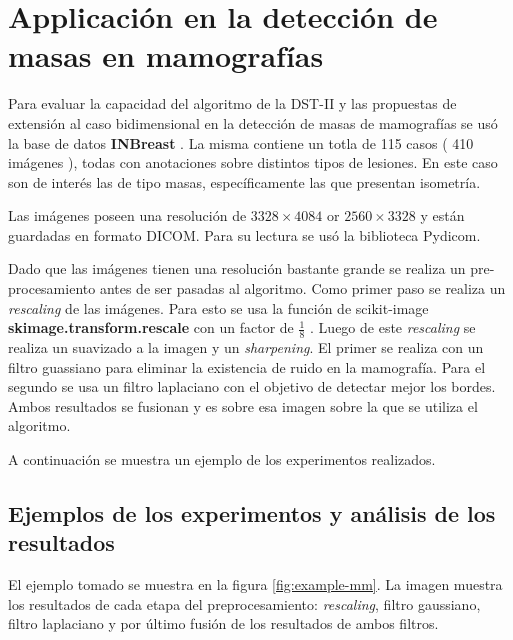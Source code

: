 \section{Applicación en la detección de masas en mamografías}

Para evaluar la capacidad del algoritmo de la DST-II y las propuestas de extensión al caso bidimensional en
la detección de masas de mamografías se usó la base de datos \textbf{INBreast} \cite{Moreira2012}. La misma 
contiene un totla de 115 casos ( 410 imágenes ), todas con anotaciones sobre distintos tipos de lesiones. 
En este caso son de interés las de tipo masas, específicamente las que presentan isometría.

Las imágenes poseen una resolución de $3328\times 4084$ or $2560\times 3328$ y están guardadas en formato
DICOM. Para su lectura se usó la biblioteca Pydicom.

Dado que las imágenes tienen una resolución bastante grande se realiza un pre-procesamiento antes de ser pasadas al
algoritmo. Como primer paso se realiza un \textit{rescaling} de las imágenes. Para esto se usa la función de scikit-image
\textbf{skimage.transform.rescale} con un factor de $\frac{1}{8}$ \cite{skimage-transform}. Luego de este \textit{rescaling}
se realiza un suavizado a la imagen y un \textit{sharpening}. El primer se realiza con un filtro guassiano
para eliminar la existencia de ruido en la mamografía. Para el segundo se usa un filtro laplaciano con el objetivo
de detectar mejor los bordes. Ambos resultados se fusionan y es sobre esa imagen sobre la que se utiliza el algoritmo.

A continuación se muestra un ejemplo de los experimentos realizados.

\subsection{Ejemplos de los experimentos y análisis de los resultados}

El ejemplo tomado se muestra en la figura \ref{fig:example-mm}. La imagen muestra los resultados de cada etapa 
del preprocesamiento: \textit{rescaling}, filtro gaussiano, filtro laplaciano y por último fusión de los
resultados de ambos filtros.

